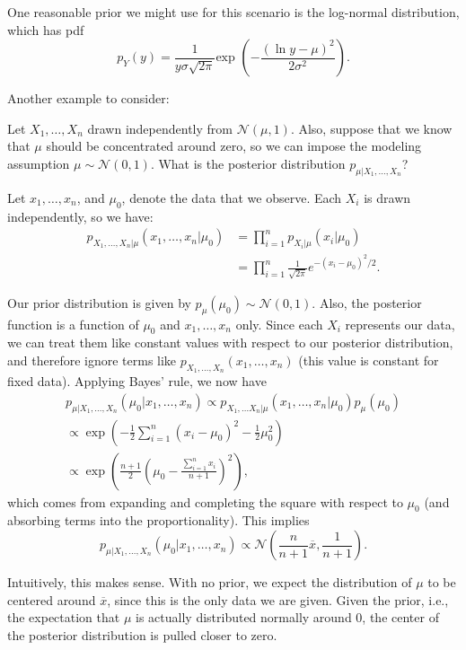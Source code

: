 One reasonable prior we might use for this scenario is the \ac{log-normal distribution}, which has pdf
\[p_Y(y) = \frac{1}{y\sigma \sqrt{2\pi}}\text{exp }\left(-\frac{(\ln{y} - \mu)^2}{2\sigma^2}\right).\]

Another example to consider:

\begin{example}
\exlabel

Let $X_1, \hdots, X_n$ drawn independently from $\mathcal{N}(\mu, 1)$. Also, suppose that we know that $\mu$ should be concentrated around zero, so we can impose the modeling assumption $\mu\sim \mathcal{N}(0,1)$. What is the posterior distribution $p_{\mu\vert X_1, \hdots, X_n}$?
\end{example}

Let $x_1, \hdots, x_n$, and $\mu_0$, denote the data that we observe. Each $X_i$ is drawn independently, so we have: 
\begin{align*}
    p_{X_1, \hdots, X_n\vert \mu}(x_1, \hdots, x_n\vert \mu_0) &= \prod_{i=1}^n p_{X_i\vert \mu}(x_i\vert \mu_0) \\ 
    &= \prod_{i=1}^n \frac{1}{\sqrt{2\pi}}e^{-(x_i-\mu_0)^2/2}.
\end{align*}

Our prior distribution is given by $p_{\mu}(\mu_0)\sim \mathcal{N}(0,1)$. Also, the posterior function is a function of $\mu_0$ and $x_1, \hdots, x_n$ only. Since each $X_i$ represents our data, we can treat them like constant values with respect to our posterior distribution, and therefore ignore terms like $p_{X_1, \hdots, X_n}(x_1, \hdots, x_n)$ (this value is constant for fixed data). Applying Bayes' rule, we now have  
\begin{align*}
    p_{\mu | X_1, \hdots, X_n}(\mu_0 | x_1, \hdots, x_n) \propto p_{X_1, \hdots X_n | \mu}(x_1, \hdots, x_n | \mu_0)p_{\mu}(\mu_0) \\
    \propto \exp \left(-\frac{1}{2}\sum_{i=1}^n(x_i-\mu_0)^2 - \frac{1}{2}\mu_0^2\right) \\
    \propto \exp \left(\frac{n+1}{2}\left(\mu_0 - \frac{\sum_{i=1}^nx_i}{n+1}\right)^2\right),
\end{align*}
which comes from expanding and completing the square with respect to $\mu_0$ (and absorbing terms into the proportionality). This implies 
\[p_{\mu | X_1, \hdots, X_n}(\mu_0 | x_1, \hdots, x_n) \propto \mathcal{N}\left(\frac{n}{n+1}\overline{x}, \frac{1}{n+1}\right).\]

Intuitively, this makes sense. With no prior, we expect the distribution of $\mu$ to be centered around $\overline{x}$, since this is the only data we are given. Given the prior, i.e., the expectation that $\mu$ is actually distributed normally around $0$, the center of the posterior distribution is pulled closer to zero. 

